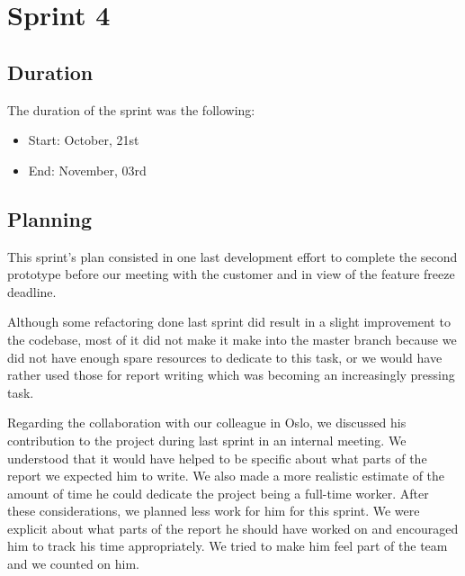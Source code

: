 
\chapter{Sprint 4}
\label{Sprint4}

\section{Duration}
The duration of the sprint was the following:
\begin{itemize}
\item Start: October, 21st
\item End: November, 03rd
\end{itemize}

\section{Planning}

This sprint's plan consisted in one last development effort to complete the second prototype
before our meeting with the customer and in view of the feature freeze deadline.

Although some refactoring done last sprint did result in a slight improvement to the codebase,
most of it did not make it make into the master branch because we did not have enough spare resources
to dedicate to this task, or we would have rather used those for report writing which
was becoming an increasingly pressing task.

Regarding the collaboration with our colleague in Oslo, we discussed his contribution
to the project during last sprint in an internal meeting.
We understood that it would have helped to be specific about what parts
of the report we expected him to write. We also made a more realistic estimate
of the amount of time he could dedicate the project being a full-time worker.
After these considerations, we planned less work for him for this sprint.
We were explicit about what parts of the report he should have worked on and
encouraged him to track his time appropriately.
We tried to make him feel part of the team and we counted on him.

\iffalse
For our colleague in Oslo, we planned documentation exclusively in order
not to fall behind with the status of the report.

Talking with him during an internal meeting, we understood that it would have helped to be specific
about what parts of the report we expected him to write.
Being cautious about the matter,
we planned less work for him for the next sprint but we were more explicit about what parts
of the report he should have worked on and encouraged him to track his time appropriately.
We tried to make him feel part of the team and we counted on him.
\fi

